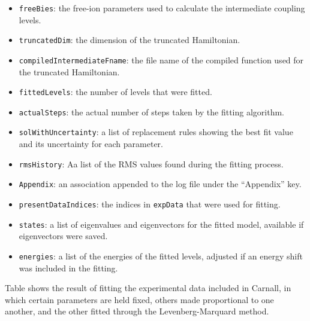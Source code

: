 \documentclass{article}
\newcommand{\codetext}[1]{{\color{BlueViolet} \texttt{#1}}}
\begin{document}
\begin{itemize}
    \item \codetext{freeBies}: the free-ion parameters used to calculate the intermediate coupling levels.

    \item \codetext{truncatedDim}: the dimension of the truncated Hamiltonian.

    \item \codetext{compiledIntermediateFname}: the file name of the compiled function used for the truncated Hamiltonian.
 
    \item \codetext{fittedLevels}: the number of levels that were fitted.

    \item \codetext{actualSteps}: the actual number of steps taken by the fitting algorithm.

    \item \codetext{solWithUncertainty}: a list of replacement rules showing the best fit value and its uncertainty for each parameter.

    \item \codetext{rmsHistory}: Aa list of the RMS values found during the fitting process.

    \item \codetext{Appendix}: an association appended to the log file under the ``Appendix'' key.

    \item \codetext{presentDataIndices}: the indices in \codetext{expData} that were used for fitting.

    \item \codetext{states}: a list of eigenvalues and eigenvectors for the fitted model, available if eigenvectors were saved.

    \item \codetext{energies}: a list of the energies of the fitted levels, adjusted if an energy shift was included in the fitting.
\end{itemize}

Table  shows the result of fitting the experimental data included in Carnall, in which certain parameters are held fixed, others made proportional to one another, and the other fitted through the Levenberg-Marquard method.
\end{document}

